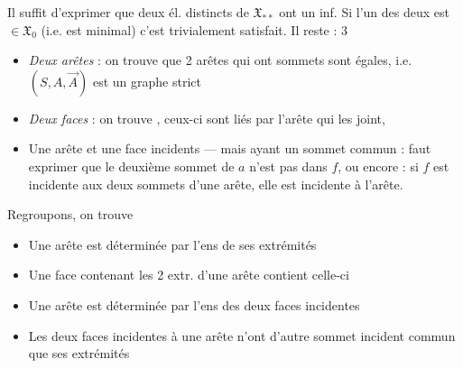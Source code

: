 \documentclass[11pt,a4paper]{article}
\begin{document}

Il suffit d'exprimer que deux él. distincts  de $\mathfrak{X}_{**}$ \ill{} ont un inf. Si l'un des
deux est $\in \mathfrak{X}_0$ (i.e. est minimal) c'est trivialement
satisfait. Il reste : 3 
\begin{itemize}
  \item[1°)] \emph{Deux arêtes} : on trouve que 2 arêtes qui ont \ill{}
    sommets sont égales, i.e. $(S, A, \vec{A})$ est un graphe strict
  \item[2°)] \emph{Deux faces} : on trouve 
     ,  ceux-ci sont liés
    \struck{\ill{}} par l'arête qui les joint, 
  \item[3°)] Une arête  et une face   incidents
    — mais ayant un sommet commun :  faut exprimer que le deuxième
    sommet de $a$ n'est pas dans $f$, ou encore \struck{\ill{}} : si $f$ est
    incidente aux deux sommets d'une arête, elle est incidente à l'arête.
\end{itemize}

Regroupons, on trouve

\begin{itemize}
  \item[d$_1$)] Une arête est déterminée par  l'ens de ses
    extrémités
  \item[d$_2$)] Une face contenant les 2 extr. d'une arête contient celle-ci
\end{itemize}

\begin{itemize}
  \item[d$'_1$)] Une arête est déterminée par l'ens des deux faces incidentes
  \item[d$'_2$)] Les deux faces incidentes à une arête n'ont d'autre sommet
    incident commun que ses extrémités
\end{itemize}

\end{document}
